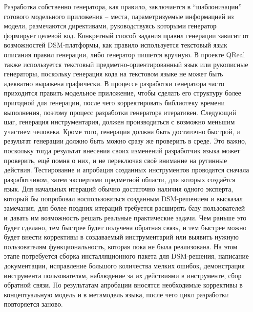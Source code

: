 Разработка собственно генератора, как правило, заключается в “шаблонизации” готового модельного приложения – места, параметризуемые информацией из модели, размечаются директивами, руководствуясь которыми генератор формирует целевой код. Конкретный способ задания правил генерации зависит от возможностей DSM-платформы, как правило используется текстовый язык описания правил генерации, либо генератор пишется вручную. В проекте QReal также используется текстовый предметно-ориентированный язык или рукописные генераторы, поскольку генерация кода на текстовом языке не может быть адекватно выражена графически. В процессе разработки генератора часто приходится править модельное приложение, чтобы сделать его структуру более пригодной для генерации, после чего корректировать библиотеку времени выполнения, поэтому процесс разработки генератора итеративен.
Следующий шаг, генерация инструментария, должен производиться с возможно меньшим участием человека. Кроме того, генерация должна быть достаточно быстрой, и результат генерации должно быть можно сразу же проверить в среде. Это важно, поскольку тогда результат внесения своих изменений разработчик языка может проверить, ещё помня о них, и не переключая своё внимание на рутинные действия. 
Тестирование и апробация созданных инструментов проводятся сначала разработчиком, затем экспертами предметной области, для которых создаётся язык. Для начальных итераций обычно достаточно наличия одного эксперта, который бы попробовал воспользоваться созданным DSM-решением и высказал замечания, для более поздних итераций требуется расширять базу пользователей и давать им возможность решать реальные практические задачи. Чем раньше это будет сделано, тем быстрее будет получена обратная связь, и тем быстрее можно будет внести коррективы в создаваемый инструментарий или выявить нужную пользователям функциональность, которая пока не была реализована. На этом этапе потребуется сборка инсталляционного пакета для DSM-решения, написание документации, исправление большого количества мелких ошибок, демонстрация инструмента пользователям, наблюдение за их действиями в инструменте, сбор обратной связи. По результатам апробации вносятся необходимые коррективы в концептуальную модель и в метамодель языка, после чего цикл разработки повторяется заново.
